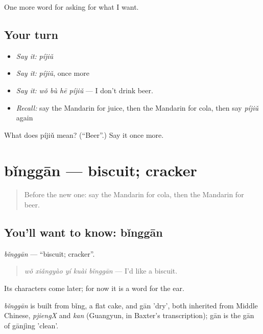 \begin{grammarlens}[title={What you've built}]
One more word for asking for what I want.
\end{grammarlens}

\subsection*{Your turn}
\begin{itemize}
\raggedright
  \item \emph{Say it:} \emph{píjiǔ}
  \item \emph{Say it:} \emph{píjiǔ}, once more
  \item \emph{Say it:} \emph{wǒ bù hē píjiǔ} — I don't drink beer.
  \item \emph{Recall:} say the Mandarin for juice, then the Mandarin for cola, then say \emph{píjiǔ} again
\end{itemize}

\begin{tcolorbox}[breakable,colback=teal!4,colframe=teal!35!black,title={Before you move on}]
What does píjiǔ mean? (\textquotedblleft{}Beer\textquotedblright{}.) Say it once more.
\end{tcolorbox}
\section[bǐnggān]{bǐnggān — biscuit; cracker}

\label{lesson:ZH-C102-binggan}



\begin{quote}
Before the new one: say the Mandarin for cola, then the Mandarin for beer.
\end{quote}

\subsection*{You'll want to know: bǐnggān}
\emph{bǐnggān} — \textquotedblleft{}biscuit; cracker\textquotedblright{}.

\begin{quote}
\emph{wǒ xiǎngyào yí kuài bǐnggān} — I'd like a biscuit.
\end{quote}

Its characters come later; for now it is a word for the ear.

\begin{cousinweb}
\emph{bǐnggān} is built from bǐng, a flat cake, and gān 'dry', both inherited from Middle Chinese, \emph{pjiengX} and \emph{kan} (Guangyun, in Baxter's transcription); gān is the gān of gānjìng 'clean'.
\end{cousinweb}

